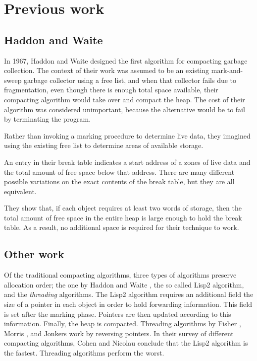 \section{Previous work}

\subsection{Haddon and Waite}

In 1967, Haddon and Waite \cite{Haddon:1967} designed the first
algorithm for compacting garbage collection.  The context of their
work was assumed to be an existing mark-and-sweep garbage collector
using a free list, and when that collector fails due to fragmentation,
even though there is enough total space available, their compacting
algorithm would take over and compact the heap.  The cost of their
algorithm was considered unimportant, because the alternative would be
to fail by terminating the program.

Rather than invoking a marking procedure to determine live data, they
imagined using the existing free list to determine areas of available
storage. 

An entry in their break table indicates a start address of a zones of
live data and the total amount of free space below that address.
There are many different possible variations on the exact contents of
the break table, but they are all equivalent.

They show that, if each object requires at least two words of storage,
then the total amount of free space in the entire heap is large enough
to hold the break table.  As a result, no additional space is
required for their technique to work.

\subsection{Other work}

Of the traditional compacting algorithms, three types of algorithms
preserve allocation order; the one by Haddon and Waite
\cite{Haddon:1967}, the so called Lisp2 algorithm, and the
\emph{threading} algorithms.  The Lisp2 algorithm requires an
additional field the size of a pointer in each object in order to hold
forwarding information.  This field is set after the marking phase.
Pointers are then updated according to this information.  Finally, the
heap is compacted.  Threading algorithms by Fisher \cite{fish74},
Morris \cite{morr78}, and Jonkers \cite{jonk79} work by reversing
pointers.  In their survey of different compacting algorithms, Cohen
and Nicolau \cite{Cohen:1983:CCA:69575.357226} conclude that the Lisp2
algorithm is the fastest.  Threading algorithms perform the worst.

